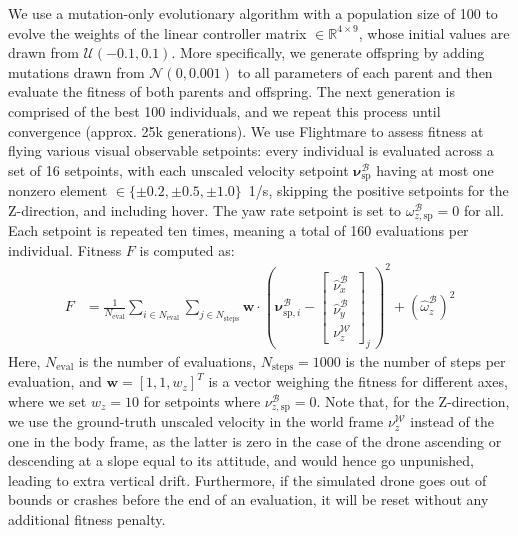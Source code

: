 We use a mutation-only evolutionary algorithm with a population size of 100 to evolve the weights of the linear controller matrix $\in \mathbb{R}^{4\times 9}$, whose initial values are drawn from $\mathcal{U}(-0.1, 0.1)$. More specifically, we generate offspring by adding mutations drawn from $\mathcal{N}(0, 0.001)$ to all parameters of each parent and then evaluate the fitness of both parents and offspring. The next generation is comprised of the best 100 individuals, and we repeat this process until convergence (approx. 25k generations). We use Flightmare to assess fitness at flying various visual observable setpoints: every individual is evaluated across a set of 16 setpoints, with each unscaled velocity setpoint $\boldsymbol{\nu}^\mathcal{B}_{\mathrm{sp}}$ having at most one nonzero element $\in \{\pm0.2,\pm0.5,\pm1.0\}$~1/s, skipping the positive setpoints for the Z-direction, and including hover. The yaw rate setpoint is set to $\omega_{z,\mathrm{sp}}^\mathcal{B}=0$ for all. Each setpoint is repeated ten times, meaning a total of 160 evaluations per individual. Fitness $F$ is computed as:
\begin{align}
    F &= \frac{1}{N_\mathrm{eval}} \sum_{i \in N_\mathrm{eval}} \sum_{j \in N_{\mathrm{steps}}} \boldsymbol{w} \cdot \left( \boldsymbol{\nu}^\mathcal{B}_{\mathrm{sp},i} -
    \begin{bmatrix}
        \hat{\nu}_x^\mathcal{B}\\
        \hat{\nu}_y^\mathcal{B}\\
        \nu_z^\mathcal{W}
    \end{bmatrix}_j\,
    \right)^2 + \left(\hat{\omega}_z^\mathcal{B}\right)^2
\end{align}
Here, $N_{\mathrm{eval}}$ is the number of evaluations, $N_\mathrm{steps}=1000$ is the number of steps per evaluation, and $\boldsymbol{w}=[1, 1, w_z]^T$ is a vector weighing the fitness for different axes, where we set $w_z=10$ for setpoints where $\nu^\mathcal{B}_{z,\mathrm{sp}}=0$. Note that, for the Z-direction, we use the ground-truth unscaled velocity in the world frame $\nu_z^\mathcal{W}$ instead of the one in the body frame, as the latter is zero in the case of the drone ascending or descending at a slope equal to its attitude, and would hence go unpunished, leading to extra vertical drift. Furthermore, if the simulated drone goes out of bounds or crashes before the end of an evaluation, it will be reset without any additional fitness penalty.

